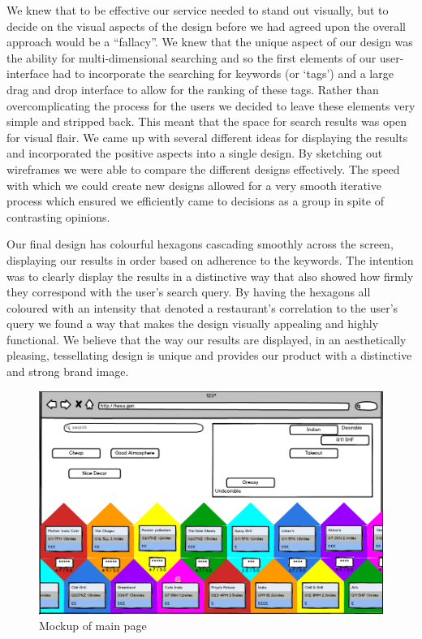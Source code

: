 \documentclass[10pt,a4paper]{article}
\begin{document}
We knew that to be effective our service needed to stand out visually, but to decide on the visual aspects of the design before we had agreed upon the overall approach would be a “fallacy”. We knew that the unique aspect of our design was the ability for multi-dimensional searching and so the first elements of our user-interface had to incorporate the searching for keywords (or ‘tags’) and a large drag and drop interface to allow for the ranking of these tags. Rather than overcomplicating the process for the users we decided to leave these elements very simple and stripped back. This meant that the space for search results was open for visual flair. We came up with several different ideas for displaying the results and incorporated the positive aspects into a single design. By sketching out wireframes we were able to compare the different designs effectively. The speed with which we could create new designs allowed for a very smooth iterative process which ensured we efficiently came to decisions as a group in spite of contrasting opinions.

Our final design has colourful hexagons cascading smoothly across the screen, displaying our results in order based on adherence to the keywords. The intention was to clearly display the results in a distinctive way that also showed how firmly they correspond with the user’s search query. By having the hexagons all coloured with an intensity that denoted a restaurant's correlation to the user’s query we found a way that makes the design visually appealing and highly functional. We believe that the way our results are displayed, in an aesthetically pleasing, tessellating  design is unique and provides our product with a distinctive and strong brand image.

\begin{figure}[H]
	\begin{center}
		\includegraphics[scale=0.4]{Screenshot.png}
		\caption{Mockup of main page}
		\label{figure:calc-1}
	\end{center}
\end{figure}
\end{document}
